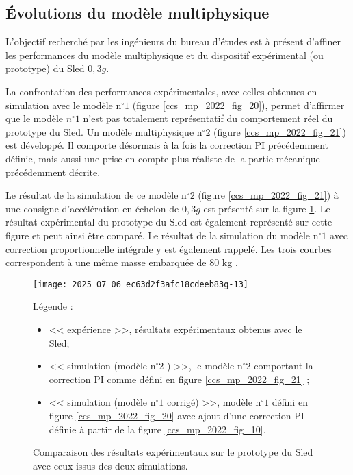 \subsection{Évolutions du modèle multiphysique \label{ccs_mp_2022_sec_4C}}
\begin{obj}
L'objectif recherché par les ingénieurs du bureau d'études est à présent d'affiner les performances du modèle multiphysique et du dispositif expérimental (ou prototype) du Sled $0,3 g$.
\end{obj}

\ifprof
\else

La confrontation des performances expérimentales, avec celles obtenues en simulation avec le modèle $\mathrm{n}^{\circ} 1$ (figure \ref{ccs_mp_2022_fig_20}), permet d'affirmer que le modèle $n^{\circ} 1$ n'est pas totalement représentatif du comportement réel du prototype du Sled. Un modèle multiphysique $\mathrm{n}^{\circ} 2$ (figure \ref{ccs_mp_2022_fig_21}) est développé. Il comporte désormais à la fois
la correction PI précédemment définie, mais aussi une prise en compte plus réaliste de la partie mécanique précédemment décrite.

Le résultat de la simulation de ce modèle $\mathrm{n}^{\circ} 2$ (figure \ref{ccs_mp_2022_fig_21}) à une consigne d'accélération en échelon de $0,3 g$ est présenté sur la figure \ref{ccs_mp_2022_fig_18}. Le résultat expérimental du prototype du Sled est également représenté sur cette figure et peut ainsi être comparé. Le résultat de la simulation du modèle $\mathrm{n}^{\circ} 1$ avec correction proportionnelle intégrale y est également rappelé. Les trois courbes correspondent à une même masse embarquée de 80 kg .

\begin{figure}[!h]
\centering

\texttt{[image: 2025\_07\_06\_ec63d2f3afc18cdeeb83g-13]}

\caption{\label{ccs_mp_2022_fig_18}Comparaison des résultats expérimentaux sur le prototype du Sled avec ceux issus des deux simulations. }
Légende :

\begin{itemize}
  \item << expérience >>, résultats expérimentaux obtenus avec le Sled;
  \item << simulation (modèle $\mathrm{n}^{\circ} 2$ ) >>, le modèle $\mathrm{n}^{\circ} 2$ comportant la correction PI comme défini en figure \ref{ccs_mp_2022_fig_21} ;
  \item << simulation (modèle $\mathrm{n}^{\circ} 1$ corrigé) >>, modèle $\mathrm{n}^{\circ} 1$ défini en figure \ref{ccs_mp_2022_fig_20} avec ajout d'une correction PI définie à partir de la figure \ref{ccs_mp_2022_fig_10}.
\end{itemize}
\end{figure}


